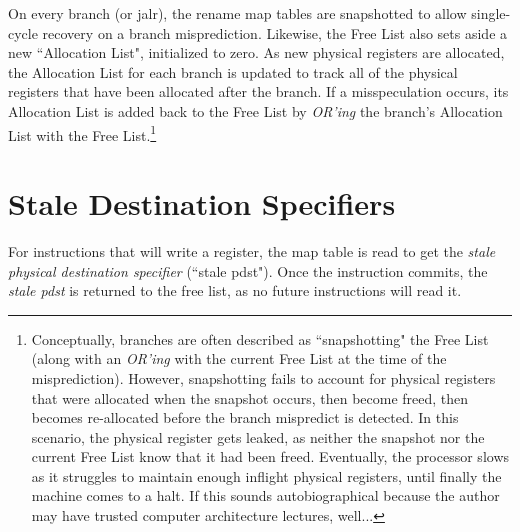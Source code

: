 On every branch (or jalr), the rename map tables are snapshotted to allow single-cycle recovery on a branch misprediction. Likewise, the Free List also sets aside a new ``Allocation List", initialized to zero.  As new physical registers are allocated, the Allocation List for each branch is updated to track all of the physical registers that have been allocated after the branch. If a misspeculation occurs, its Allocation List is added back to the Free List by {\em OR'ing} the branch's Allocation List with the Free List.\footnote{Conceptually, branches are often described as ``snapshotting" the Free List (along with an {\em OR'ing} with the current Free List at the time of the misprediction). However, snapshotting fails to account for physical registers that were allocated when the snapshot occurs, then become freed, then becomes re-allocated before the branch mispredict is detected.  In this scenario, the physical register gets leaked, as neither the snapshot nor the current Free List know that it had been freed.  Eventually, the processor slows as it struggles to maintain enough inflight physical registers, until finally the machine comes to a halt. If this sounds autobiographical because the author may have trusted computer architecture lectures, well...}

\section{Stale Destination Specifiers}

For instructions that will write a register, the map table is read to get the {\em stale physical destination specifier} (``stale pdst").  Once the instruction commits, the {\em stale pdst} is returned to the free list, as no future instructions will read it.

%



